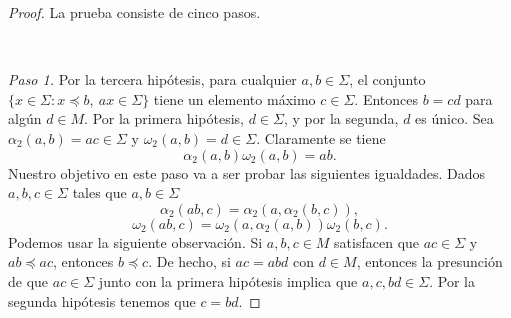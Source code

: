 \documentclass[12pt]{book}
\theoremstyle{definition}
\begin{document}
\begin{proof} La prueba consiste de cinco pasos.

\ 

\textit{Paso 1.} Por la tercera hipótesis, para cualquier $a,b\in\Sigma$, el conjunto $\{x\in\Sigma:x\preceq b,\ ax\in\Sigma\}$ tiene un elemento máximo $c\in\Sigma$. Entonces $b=cd$ para algún $d\in M$. Por la primera hipótesis, $d\in\Sigma$, y por la segunda, $d$ es único. Sea $\alpha_2(a,b)=ac\in\Sigma$ y $\omega_2(a,b)=d\in\Sigma$. Claramente se tiene
\begin{equation}
\label{eq:div_max}
\alpha_2(a,b)\omega_2(a,b)=ab.
\end{equation}
Nuestro objetivo en este paso va a ser probar las siguientes igualdades. Dados $a,b,c\in\Sigma$ tales que $a,b\in\Sigma$
\begin{equation}
\label{eq:alfa_com}
\alpha_2(ab,c)=\alpha_2(a,\alpha_2(b,c)),
\end{equation}
\begin{equation}
\label{eq:omega_com}
\omega_2(ab,c)=\omega_2(a,\alpha_2(a,b))\omega_2(b,c).
\end{equation}
Podemos usar la siguiente observación. Si $a,b,c\in M$ satisfacen que $ac\in\Sigma$ y $ab\preceq ac$, entonces $b\preceq c$. De hecho, si $ac=abd$ con $d\in M$, entonces la presunción de que $ac\in\Sigma$ junto con la primera hipótesis implica que $a,c,bd\in\Sigma$. Por la segunda hipótesis tenemos que $c=bd$.


\end{proof}
\end{document}
